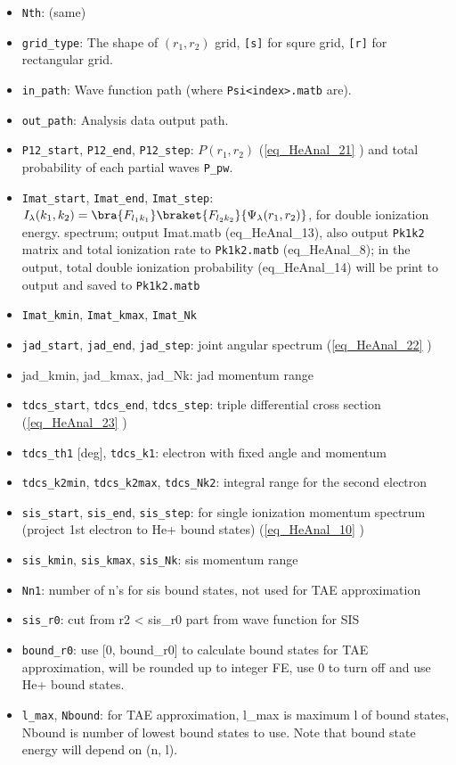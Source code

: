 
\begin{itemize}
\item \verb`Nth`: (same)
\item \verb`grid_type`: The shape of $(r_1,r_2)$ grid, \verb`[s]` for squre grid, \verb`[r]` for rectangular grid.
\item \verb`in_path`: Wave function path (where \verb`Psi<index>.matb` are).
\item \verb`out_path`: Analysis data output path.

\item \verb`P12_start`, \verb`P12_end`, \verb`P12_step`: $P(r_1, r_2)$ (\autoref{eq_HeAnal_21} ) and total probability of each partial waves \verb`P_pw`.

\item \verb`Imat_start`, \verb`Imat_end`, \verb`Imat_step`: $I_\lambda(k_1, k_2) = \bra{F_{l_1k_1}}\braket{F_{l_2k_2}}{\Psi_\lambda(r_1,r_2)}$, for double ionization energy. spectrum; output Imat.matb (eq_HeAnal_13), also output \verb`Pk1k2` matrix and total ionization rate to \verb`Pk1k2.matb` (eq_HeAnal_8); in the output, total double ionization probability (eq_HeAnal_14) will be print to output and saved to \verb`Pk1k2.matb`
\item \verb`Imat_kmin`, \verb`Imat_kmax`, \verb`Imat_Nk`

\item \verb`jad_start`, \verb`jad_end`, \verb`jad_step`: joint angular spectrum (\autoref{eq_HeAnal_22} )
\item jad_kmin, jad_kmax, jad_Nk: jad momentum range

\item \verb`tdcs_start`, \verb`tdcs_end`, \verb`tdcs_step`: triple differential cross section (\autoref{eq_HeAnal_23} )
\item \verb`tdcs_th1` [deg], \verb`tdcs_k1`: electron with fixed angle and momentum
\item \verb`tdcs_k2min`, \verb`tdcs_k2max`, \verb`tdcs_Nk2`: integral range for the second electron

\item \verb`sis_start`, \verb`sis_end`, \verb`sis_step`: for single ionization momentum spectrum (project 1st electron to He+ bound states) (\autoref{eq_HeAnal_10} )
\item \verb`sis_kmin`, \verb`sis_kmax`, \verb`sis_Nk`: sis momentum range
\item \verb`Nn1`: number of n's for sis bound states, not used for TAE approximation
\item \verb`sis_r0`: cut from r2 < sis_r0 part from wave function for SIS
\item \verb`bound_r0`: use [0, bound_r0] to calculate bound states for TAE approximation, will be rounded up to integer FE, use 0 to turn off and use He+ bound states.
\item \verb`l_max`, \verb`Nbound`: for TAE approximation, l_max is maximum l of bound states, Nbound is number of lowest bound states to use. Note that bound state energy will depend on (n, l).


\end{itemize}
